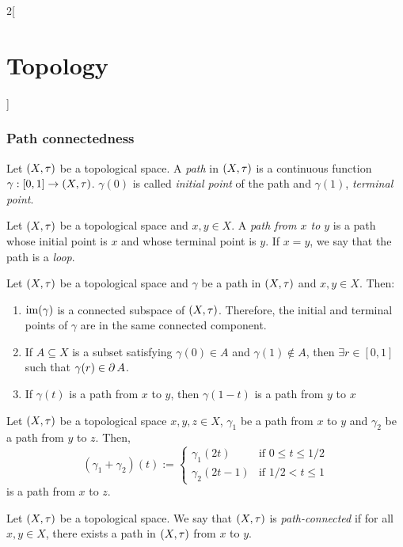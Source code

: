 \documentclass[../../../main_math.tex]{subfiles}
\begin{document}
\begin{multicols}{2}[\section{Topology}]
  \subsubsection{Path connectedness}
  \begin{definition}
    Let $(X,\tau)$ be a topological space. A \emph{path} in $(X,\tau)$ is a continuous function $\gamma:[0,1]\rightarrow (X,\tau)$. $\gamma(0)$ is called \emph{initial point} of the path and $\gamma(1)$, \emph{terminal point}.
  \end{definition}
  \begin{definition}
    Let $(X,\tau)$ be a topological space and $x,y\in X$. A \emph{path from $x$ to $y$} is a path whose initial point is $x$ and whose terminal point is $y$. If $x=y$, we say that the path is a \emph{loop}.
  \end{definition}
  \begin{proposition}
    Let $(X,\tau)$ be a topological space and $\gamma$ be a path in $(X,\tau)$ and $x,y\in X$. Then:
    \begin{enumerate}
      \item $\operatorname{im}(\gamma)$ is a connected subspace of $(X,\tau)$. Therefore, the initial and terminal points of $\gamma$ are in the same connected component.
      \item If $A\subseteq X$ is a subset satisfying $\gamma(0)\in A$ and $\gamma(1)\notin A$, then $\exists r\in[0,1]$ such that $\gamma(r)\in\operatorname{\partial} A$.
      \item If $\gamma(t)$ is a path from $x$ to $y$, then  $\gamma(1-t)$ is a path from $y$ to $x$
    \end{enumerate}
  \end{proposition}
  \begin{proposition}
    Let $(X,\tau)$ be a topological space $x,y,z\in X$, $\gamma_1$ be a path from $x$ to $y$ and $\gamma_2$ be a path from $y$ to $z$. Then, $$(\gamma_1+\gamma_2)(t):=
      \begin{cases}
        \gamma_1(2t)   & \text{if }0\leq t\leq 1/2 \\
        \gamma_2(2t-1) & \text{if }1/2 <t\leq 1
      \end{cases}
    $$
    is a path from $x$ to $z$.
  \end{proposition}
  \begin{definition}
    Let $(X,\tau)$ be a topological space. We say that $(X,\tau)$ is \emph{path-connected} if for all $x,y\in X$, there exists a path in $(X,\tau)$ from $x$ to $y$.
  \end{definition}

\end{multicols}
\end{document}
